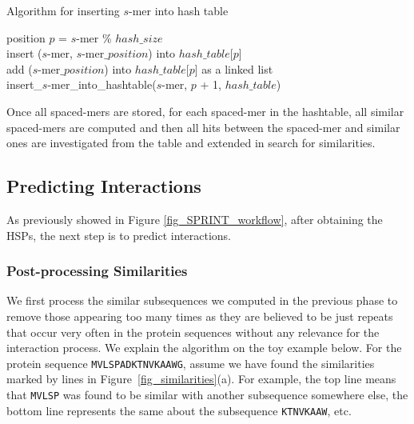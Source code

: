 \begin{algorithm}[h!]
 \SetAlgoLined 
\caption{Algorithm for inserting $s$-mer into hash table \label{algo:insert_ht}}
 \Output{}
	position $p$ = $s$-mer \% $hash\_size$ \\
	{
		insert ($s$-mer, $s$-mer$\_position$) into $hash\_table$[$p$]\\
	}
	{
		add ($s$-mer$\_position$) into $hash\_table$[$p$] as a linked list\\
	}
	{
		insert\_$s$-mer\_into\_hashtable($s$-mer, $p$ + 1, $hash\_table$)\\
	}
\end{algorithm}

Once all spaced-mers are stored, for each spaced-mer in the hashtable, all similar spaced-mers are computed and then all hits between the spaced-mer and similar ones are investigated from the table and extended in search for similarities. 

\subsection{Predicting Interactions}
As previously showed in Figure \ref{fig_SPRINT_workflow}, after obtaining the HSPs, the next step is to predict interactions.
\subsubsection{Post-processing Similarities}
We first process the similar subsequences we computed in the previous phase to remove those appearing too many times as they are believed to be just repeats that occur very often in the protein sequences without any relevance for the interaction process. We explain the algorithm on the toy example below. For the protein sequence {\tt MVLSPADKTNVKAAWG}, assume we have found the similarities marked by lines in  Figure~\ref{fig_similarities}(a). For example, the top line means that {\tt MVLSP} was found to be similar with another subsequence somewhere else, the bottom line represents the same about the subsequence {\tt KTNVKAAW}, etc. 

